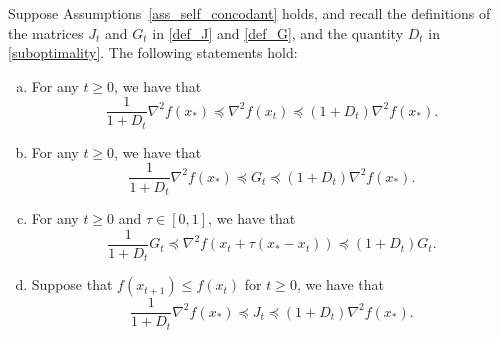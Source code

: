 \documentclass[10pt,a4paper]{amsart}
\begin{document}
\begin{lemma}\label{lemma_Hessian}
    Suppose Assumptions~\ref{ass_self_concodant} holds, and recall the definitions of the matrices $J_t$ and $G_t$ in \eqref{def_J} and \eqref{def_G}, and the quantity $D_t$ in \eqref{suboptimality}. The following statements hold: 
    \begin{enumerate}[(a)]
        \item For any $t \geq 0$, we have that
        \begin{equation}\label{eq:H_t_vs_H*}
            \frac{1}{1 + D_t}\nabla^2{f(x_*)} \preceq \nabla^2{f(x_t)} \preceq (1 + D_t)\nabla^2{f(x_*)} .
        \end{equation}
        \item For any $t \geq 0$, we have that
        \begin{equation}\label{eq:G_t_vs_H*}
            \frac{1}{1 + D_t}\nabla^2{f(x_*)} \preceq G_t \preceq (1 + D_t)\nabla^2{f(x_*)} .
        \end{equation}
        \item For any $t \geq 0$ and $\tau \in [0, 1]$, we have that
        \begin{equation}\label{eq:G_t_vs_H_t}
            \frac{1}{1 + D_t}G_t \preceq \nabla^2{f(x_t + \tau(x_* - x_t))} \preceq (1 + D_t)G_t .
        \end{equation}
        \item Suppose that $f(x_{t + 1}) \leq f(x_t)$ for $t \geq 0$, we have that
        \begin{equation}\label{eq:J_t_vs_H*}
            \frac{1}{1 + D_t}\nabla^2{f(x_*)} \preceq J_t \preceq (1 + D_t)\nabla^2{f(x_*)} .
        \end{equation}
    \end{enumerate}
\end{lemma}
\end{document}
